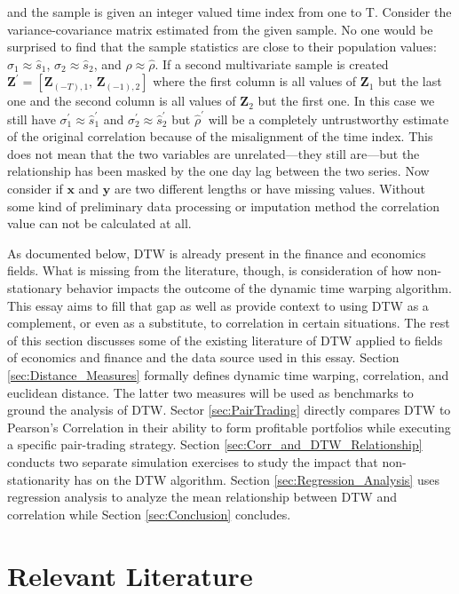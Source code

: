 \documentclass[12pt]{report}
\begin{document}
and the sample is given an integer valued time index from one to T. Consider the variance-covariance matrix estimated from the given sample. No one would be surprised to find that the sample statistics are close to their population values: $\sigma_{1} \approx \hat{s}_{1}$, $\sigma_{2} \approx \hat{s}_{2}$, and $\rho \approx \hat{\rho}$. If a second multivariate sample is created $\boldsymbol{Z}^\prime = [\boldsymbol{Z}_{(-T), 1}, \, \boldsymbol{Z}_{(-1), 2}]$ where the first column is all values of $\boldsymbol{Z}_{1}$ but the last one and the second column is all values of $\boldsymbol{Z}_{2}$ but the first one. In this case we still have $\sigma^{\prime}_{1} \approx \hat{s}^{\prime}_{1}$ and $\sigma^{\prime}_{2} \approx \hat{s}^{\prime}_{2}$ but $\hat{\rho}^{\prime}$ will be a completely untrustworthy estimate of the original correlation because of the misalignment of the time index. This does not mean that the two variables are unrelated---they still are---but the relationship has been masked by the one day lag between the two series. Now consider if $\boldsymbol{x}$ and $\boldsymbol{y}$ are two different lengths or have missing values. Without some kind of preliminary data processing or imputation method the correlation value can not be calculated at all.

As documented below, DTW is already present in the finance and economics fields. What is missing from the literature, though, is consideration of how non-stationary behavior impacts the outcome of the dynamic time warping algorithm. This essay aims to fill that gap as well as provide context to using DTW as a complement, or even as a substitute, to correlation in certain situations. The rest of this section discusses some of the existing literature of DTW applied to fields of economics and finance and the data source used in this essay. Section \ref{sec:Distance_Measures} formally defines dynamic time warping, correlation, and euclidean distance. The latter two measures will be used as benchmarks to ground the analysis of DTW. Sector \ref{sec:PairTrading} directly compares DTW to Pearson's Correlation in their ability to form profitable portfolios while executing a specific pair-trading strategy. Section \ref{sec:Corr_and_DTW_Relationship} conducts two separate simulation exercises to study the impact that non-stationarity has on the DTW algorithm. Section \ref{sec:Regression_Analysis} uses regression analysis to analyze the mean relationship between DTW and correlation while Section \ref{sec:Conclusion} concludes.


\section{Relevant Literature}
\end{document}
